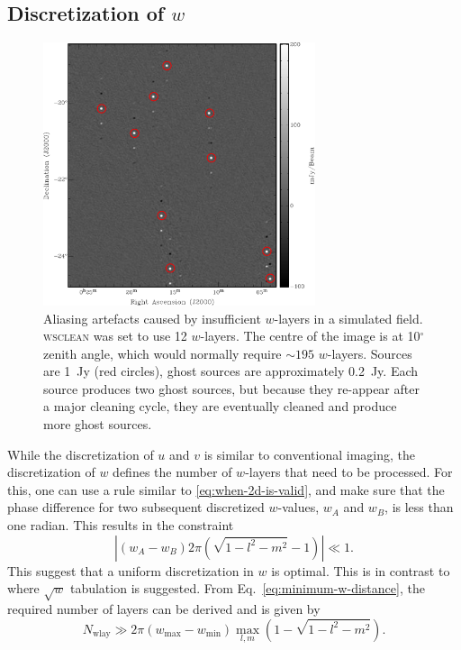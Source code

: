\documentclass[useAMS,usenatbib]{mn2e}
\newcommand{\degree}{\ensuremath{^{\circ}}\xspace}
\begin{document}
\subsection{Discretization of $w$} \label{sec:gridding-w}
\begin{figure}
\begin{center}
\includegraphics[width=8cm]{img/aliasing-example-annotated}
\caption{Aliasing artefacts caused by insufficient $w$-layers in a simulated field. \textsc{wsclean} was set to use 12 $w$-layers. The centre of the image is at 10\degree zenith angle, which would normally require $\sim195$ $w$-layers. Sources are 1~Jy (red circles), ghost sources are approximately 0.2~Jy. Each source produces two ghost sources, but because they re-appear after a major cleaning cycle, they are eventually cleaned and produce more ghost sources. }
\label{fig:aliasing-example}
\end{center}
\end{figure}
While the discretization of $u$ and $v$ is similar to conventional imaging, the discretization of $w$ defines the number of $w$-layers that need to be processed. For this, one can use a rule similar to \eqref{eq:when-2d-is-valid}, and make sure that the phase difference for two subsequent discretized $w$-values, $w_A$ and $w_B$,  is less than one radian. This results in the constraint
\begin{equation} \label{eq:minimum-w-distance}
\left|\left(w_A - w_B\right) 2\pi (\sqrt{1-l^2-m^2}-1)\right| \ll 1.
\end{equation}
This suggest that a uniform discretization in $w$ is optimal. This is in contrast to \citet{wprojection-cornwell} where $\sqrt{w}$ tabulation is suggested. From Eq.~\eqref{eq:minimum-w-distance}, the required number of layers can be derived and is given by
\begin{equation} \label{eq:nwlayers-bound}
 N_\textrm{wlay} \gg 2\pi \left(w_{\max} - w_{\min}\right) \max_{l,m} \left(1 - \sqrt{1-l^2-m^2}\right).
\end{equation}
\end{document}
